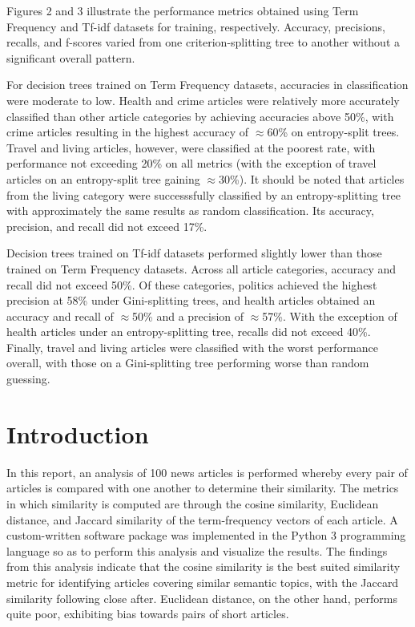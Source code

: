 \documentclass[11pt]{article}
\begin{document}
Figures 2 and 3 illustrate the performance metrics obtained using Term Frequency and Tf-idf datasets for training, respectively.
Accuracy, precisions, recalls, and f-scores varied from one criterion-splitting tree to another without a significant overall pattern.

For decision trees trained on Term Frequency datasets, accuracies in classification were moderate to low. Health and crime articles were relatively more accurately classified than other article categories by achieving accuracies above 50\%, with crime articles resulting in the highest accuracy of $\approx$60\% on entropy-split trees.
Travel and living articles, however, were classified at the poorest rate, with performance not exceeding 20\% on all metrics (with the exception of travel articles on an entropy-split tree gaining $\approx$30\%).
It should be noted that articles from the living category were successsfully classified by an entropy-splitting tree with approximately the same results as random classification.
Its accuracy, precision, and recall did not exceed 17\%.

Decision trees trained on Tf-idf datasets performed slightly lower than those trained on Term Frequency datasets.
Across all article categories, accuracy and recall did not exceed 50\%.
Of these categories, politics achieved the highest precision at 58\% under Gini-splitting trees, and health articles obtained an accuracy and recall of $\approx$50\% and a precision of $\approx$57\%.
With the exception of health articles under an entropy-splitting tree, recalls did not exceed 40\%.
Finally, travel and living articles were classified with the worst performance overall, with those on a Gini-splitting tree performing worse than random guessing.

\section{Introduction}

In this report, an analysis of 100 news articles is performed whereby every pair of articles is compared with one another to determine their similarity.
The metrics in which similarity is computed are through the cosine similarity, Euclidean distance, and Jaccard similarity of the term-frequency vectors of each article.
A custom-written software package was implemented in the Python 3 programming language so as to perform this analysis and visualize the results.
The findings from this analysis indicate that the cosine similarity is the best suited similarity metric for identifying articles covering similar semantic topics, with the Jaccard similarity following close after.
Euclidean distance, on the other hand, performs quite poor, exhibiting bias towards pairs of short articles.
\end{document}
